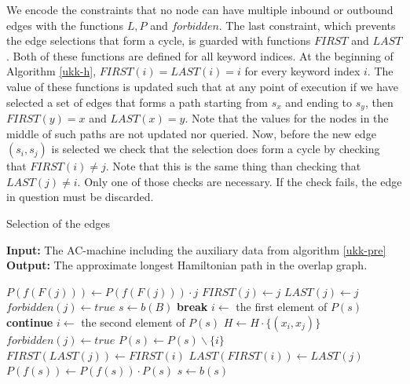\documentclass[english,twoside,censored,csm,algorithms-track-2020]{HYthesisML}
\theoremstyle{plain}
\theoremstyle{definition}
\begin{document}
We encode the constraints that no node can have multiple inbound or outbound edges
with the functions $L, P$ and $forbidden$. The last constraint, which prevents the edge selections
that form a cycle, is guarded with functions $FIRST$ and $LAST$. Both of these functions are defined
for all keyword indices. At the beginning of Algorithm \ref{ukk-h}, $FIRST(i) = LAST(i) = i$
for every keyword index $i$. The value of these functions is updated such that at any point of execution
if we have selected a set of edges that forms a path starting from $s_x$ and ending to $s_y$, then
$FIRST(y)=x$ and $LAST(x)=y$. Note that the values for the nodes in the middle of such paths are
not updated nor queried. Now, before the new edge $(s_i,s_j)$ is selected we check that the
selection does form a cycle by checking that $FIRST(i) \neq j$. Note that this is the same thing
than checking that $LAST(j) \neq i$. Only one of those checks are necessary. If the check fails,
the edge in question must be discarded. 

  \begin{algorithm}[h!]
    \caption{Selection of the edges} \label{ukk-h}
    \hspace*{\algorithmicindent} \textbf{Input:} The AC-machine including the auxiliary data from algorithm \ref{ukk-pre} \\
    \hspace*{\algorithmicindent} \textbf{Output:} The approximate longest Hamiltonian path in the overlap graph.
    \begin{algorithmic}[1]
            \State $P(f(F(j)))\gets P(f(F(j)))\cdot {j}$
            \State $FIRST(j)\gets j$
            \State $LAST(j)\gets j$
          \Else
            \State $forbidden(j)\gets true$
          \EndIf
        \EndFor  
        \State $s\gets b(B)$
                \State \textbf{break}
              \EndIf
              \State $i\gets$ the first element of $P(s)$
                  \State \textbf{continue}
                \Else
                  \State $i\gets$ the second element of $P(s)$
                \EndIf
              \EndIf  
              \State $H\gets H\cdot \{(x_i,x_j)\}$
              \State $forbidden(j)\gets true$
              \State $P(s)\gets P(s) \backslash\{i\}$
              \State $FIRST(LAST(j))\gets FIRST(i)$
              \State $LAST(FIRST(i))\gets LAST(j)$
            \EndFor
          \State $P(f(s))\gets P(f(s))\cdot P(s)$
          \EndIf
          \State $s\gets b(s)$
        \EndWhile
      \EndFunction
    \end{algorithmic}
  \end{algorithm}
\end{document}
